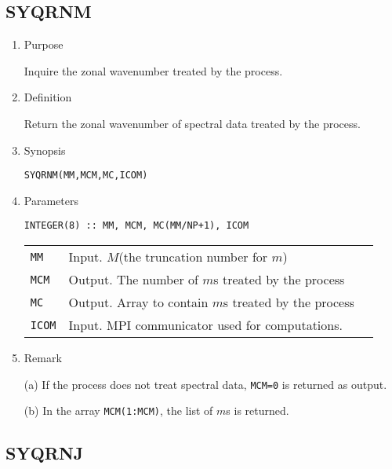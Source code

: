\documentclass[a4paper]{scrartcl}
\begin{document}

\subsection{SYQRNM}

\begin{enumerate}

\item Purpose

Inquire the zonal wavenumber treated by the process.  

\item Definition

Return the zonal wavenumber of spectral data treated by the process.  

\item Synopsis 
    
\texttt{SYQRNM(MM,MCM,MC,ICOM)}
  
\item Parameters

\begin{verbatim}
INTEGER(8) :: MM, MCM, MC(MM/NP+1), ICOM
\end{verbatim}    

\begin{tabular}{lll}
\texttt{MM} & Input. $M$(the truncation number for $m$)\\
\texttt{MCM} & Output. The number of $m$s treated by the process\\
\texttt{MC} & Output. Array to contain $m$s treated by the process\\
\texttt{ICOM} & Input. MPI communicator used for computations.
\end{tabular}

\item Remark

(a) If the process does not treat spectral data, 
\texttt{MCM=0} is returned as output.

(b) In the array \texttt{MCM(1:MCM)},
the list of $m$s is returned.

\end{enumerate}


\subsection{SYQRNJ}
\end{document}
